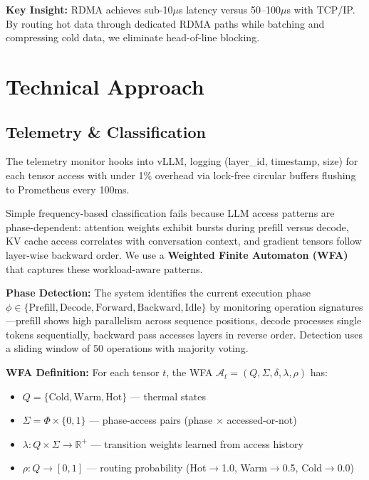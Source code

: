 \documentclass[10pt,letterpaper]{article}
\begin{document}
\textbf{Key Insight:} RDMA achieves sub-10$\mu$s latency versus 50--100$\mu$s with TCP/IP. By routing hot data through dedicated RDMA paths while batching and compressing cold data, we eliminate head-of-line blocking.

\section{Technical Approach}

\subsection{Telemetry \& Classification}
The telemetry monitor hooks into vLLM, logging (layer\_id, timestamp, size) for each tensor access with under 1\% overhead via lock-free circular buffers flushing to Prometheus every 100ms.

Simple frequency-based classification fails because LLM access patterns are phase-dependent: attention weights exhibit bursts during prefill versus decode, KV cache access correlates with conversation context, and gradient tensors follow layer-wise backward order. We use a \textbf{Weighted Finite Automaton (WFA)} that captures these workload-aware patterns.

\textbf{Phase Detection:} The system identifies the current execution phase $\phi \in \{\text{Prefill}, \text{Decode}, \text{Forward}, \text{Backward}, \text{Idle}\}$ by monitoring operation signatures---prefill shows high parallelism across sequence positions, decode processes single tokens sequentially, backward pass accesses layers in reverse order. Detection uses a sliding window of 50 operations with majority voting.

\textbf{WFA Definition:} For each tensor $t$, the WFA $\mathcal{A}_t = (Q, \Sigma, \delta, \lambda, \rho)$ has:
\begin{itemize}[nosep]
\item $Q = \{\text{Cold}, \text{Warm}, \text{Hot}\}$ --- thermal states
\item $\Sigma = \Phi \times \{0,1\}$ --- phase-access pairs (phase $\times$ accessed-or-not)
\item $\lambda: Q \times \Sigma \rightarrow \mathbb{R}^+$ --- transition weights learned from access history
\item $\rho: Q \rightarrow [0,1]$ --- routing probability (Hot$\rightarrow$1.0, Warm$\rightarrow$0.5, Cold$\rightarrow$0.0)
\end{itemize}
\end{document}
